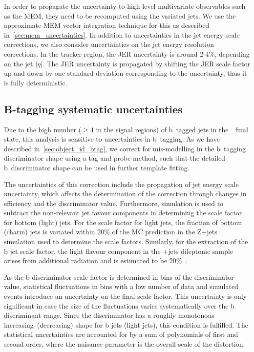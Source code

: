 In order to propagate the uncertainty to high-level multivariate observables such as the MEM, they need to be recomputed using the variated jets. We use the approximate MEM vector integration technique for this as described in~\cref{sec:mem_uncertainties}. In addition to uncertainties in the jet energy scale corrections, we also consider uncertainties on the jet energy resolution corrections. In the tracker region, the JER uncertainty is around 2-4\%, depending on the jet $|\eta|$. The JER uncertainty is propagated by shifting the JER scale factor up and down by one standard deviation corresponding to the uncertainty, thus it is fully deterministic.

\subsection{B-tagging systematic uncertainties}
\label{sec:btag_unc}
Due to the high number ($\geq4$ in the signal regions) of b~tagged jets in the~\ttHbb~final state, this analysis is sensitive to uncertainties in b~tagging. As we have described in~\cref{sec:object_id_btag}, we correct for mis-modelling in the b~tagging discriminator shape using a tag and probe method, such that the detailed b~discriminator shape can be used in further template fitting.

The uncertainties of this correction include the propagation of jet energy scale uncertainty, which affects the determination of the correction through changes in efficiency and the discriminator value. Furthermore, simulation is used to subtract the non-relevant jet favour components in determining the scale factor for bottom (light) jets. For the scale factor for light jets, the fraction of bottom (charm) jets is variated within 20\% of the MC prediction in the Z+jets simulation used to determine the scale factors. Similarly, for the extraction of the b jet scale factor, the light flavour component in the \ttbar+jets dileptonic sample arises from additional radiation and is estimated to be 20\%~\cite{CMS-PAS-BTV-15-001}.

As the b discriminator scale factor is determined in bins of the discriminator value, statistical fluctuations in bins with a low number of data and simulated events introduce an uncertainty on the final scale factor. This uncertainty is only significant in case the size of the fluctuations varies systematically over the b discriminant range. Since the discriminator has a roughly monotonous increasing (decreasing) shape for b jets (light jets), this condition is fulfilled. The statistical uncertainties are accounted for by a sum of polynomials of first and second order, where the nuisance parameter is the overall scale of the distortion.

